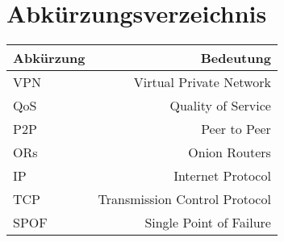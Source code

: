 \section{Abkürzungsverzeichnis}

    \begin{tabular}{l|r}
        Abkürzung & Bedeutung \\
        \hline
        VPN & Virtual Private Network \\
        QoS & Quality of Service \\
        P2P & Peer to Peer \\
        ORs & Onion Routers \\
        IP & Internet Protocol \\
        TCP & Transmission Control Protocol \\
        SPOF & Single Point of Failure \\
    \end{tabular}
